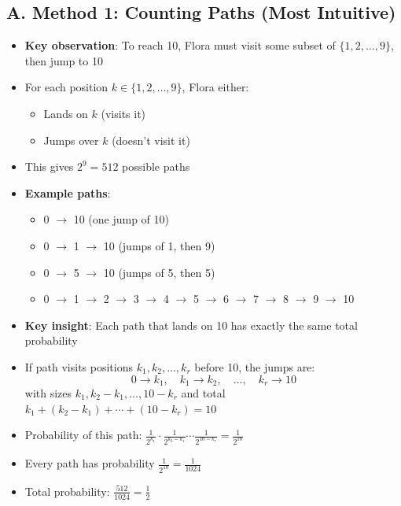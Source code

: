 \documentclass[11pt]{article}
\begin{document}
\begin{conversionbox}
\subsection*{A. Method 1: Counting Paths (Most Intuitive)}
\begin{itemize}[leftmargin=*]
    \item \textbf{Key observation}: To reach 10, Flora must visit some subset of $\{1,2,\ldots,9\}$, then jump to 10
    \item For each position $k \in \{1,2,\ldots,9\}$, Flora either:
    \begin{itemize}
        \item Lands on $k$ (visits it)
        \item Jumps over $k$ (doesn't visit it)
    \end{itemize}
    \item This gives $2^9 = 512$ possible paths
    \item \textbf{Example paths}:
    \begin{itemize}
        \item 0 $\to$ 10 (one jump of 10)
        \item 0 $\to$ 1 $\to$ 10 (jumps of 1, then 9)
        \item 0 $\to$ 5 $\to$ 10 (jumps of 5, then 5)
        \item 0 $\to$ 1 $\to$ 2 $\to$ 3 $\to$ 4 $\to$ 5 $\to$ 6 $\to$ 7 $\to$ 8 $\to$ 9 $\to$ 10
    \end{itemize}
    \item \textbf{Key insight}: Each path that lands on 10 has exactly the same total probability
    \item If path visits positions $k_1, k_2, \ldots, k_r$ before 10, the jumps are:
    \[0 \to k_1, \quad k_1 \to k_2, \quad \ldots, \quad k_r \to 10\]
    with sizes $k_1, k_2-k_1, \ldots, 10-k_r$ and total $k_1 + (k_2-k_1) + \cdots + (10-k_r) = 10$
    \item Probability of this path: $\frac{1}{2^{k_1}} \cdot \frac{1}{2^{k_2-k_1}} \cdots \frac{1}{2^{10-k_r}} = \frac{1}{2^{10}}$
    \item Every path has probability $\frac{1}{2^{10}} = \frac{1}{1024}$
    \item Total probability: $\frac{512}{1024} = \frac{1}{2}$
\end{itemize}


\end{conversionbox}
\end{document}
